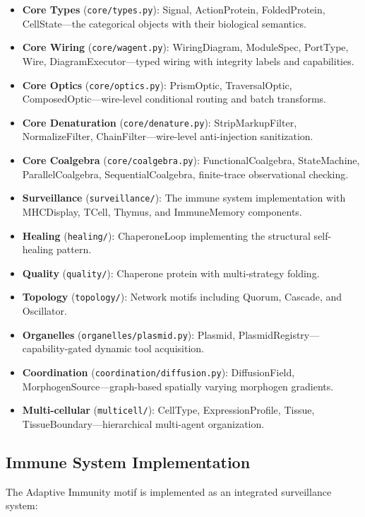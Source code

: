 \begin{itemize}[leftmargin=*]
\item \textbf{Core Types} (\texttt{core/types.py}): Signal, ActionProtein, FoldedProtein, CellState---the
categorical objects with their biological semantics.
\item \textbf{Core Wiring} (\texttt{core/wagent.py}): WiringDiagram, ModuleSpec, PortType, Wire,
DiagramExecutor---typed wiring with integrity labels and capabilities.
\item \textbf{Core Optics} (\texttt{core/optics.py}): PrismOptic, TraversalOptic,
ComposedOptic---wire-level conditional routing and batch transforms.
\item \textbf{Core Denaturation} (\texttt{core/denature.py}): StripMarkupFilter, NormalizeFilter,
ChainFilter---wire-level anti-injection sanitization.
\item \textbf{Core Coalgebra} (\texttt{core/coalgebra.py}): FunctionalCoalgebra, StateMachine,
ParallelCoalgebra, SequentialCoalgebra, finite-trace observational checking.
\item \textbf{Surveillance} (\texttt{surveillance/}): The immune system implementation with MHCDisplay,
TCell, Thymus, and ImmuneMemory components.
\item \textbf{Healing} (\texttt{healing/}): ChaperoneLoop implementing the structural self-healing pattern.
\item \textbf{Quality} (\texttt{quality/}): Chaperone protein with multi-strategy folding.
\item \textbf{Topology} (\texttt{topology/}): Network motifs including Quorum, Cascade, and Oscillator.
\item \textbf{Organelles} (\texttt{organelles/plasmid.py}): Plasmid,
PlasmidRegistry---capability-gated dynamic tool acquisition.
\item \textbf{Coordination} (\texttt{coordination/diffusion.py}): DiffusionField,
MorphogenSource---graph-based spatially varying morphogen gradients.
\item \textbf{Multi-cellular} (\texttt{multicell/}): CellType, ExpressionProfile, Tissue,
TissueBoundary---hierarchical multi-agent organization.
\end{itemize}

\subsection{Immune System Implementation}

The Adaptive Immunity motif is implemented as an integrated surveillance system:

